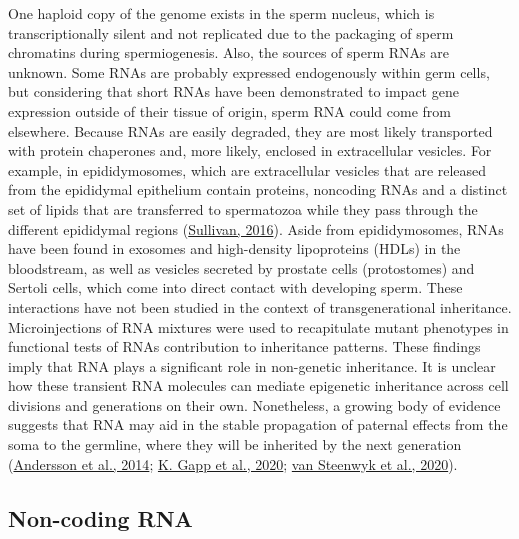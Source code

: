 \documentclass[12pt,twoside]{reedthesis}
\begin{document}
One haploid copy of the genome exists in the sperm nucleus, which is
transcriptionally silent and not replicated due to the packaging of
sperm chromatins during spermiogenesis. Also, the sources of sperm RNAs
are unknown. Some RNAs are probably expressed endogenously within germ
cells, but considering that short RNAs have been demonstrated to impact
gene expression outside of their tissue of origin, sperm RNA could come
from elsewhere. Because RNAs are easily degraded, they are most likely
transported with protein chaperones and, more likely, enclosed in
extracellular vesicles. For example, in epididymosomes, which are
extracellular vesicles that are released from the epididymal epithelium
contain proteins, noncoding RNAs and a distinct set of lipids that are
transferred to spermatozoa while they pass through the different
epididymal regions (\protect\hyperlink{ref-sullivan2016}{Sullivan, 2016}). Aside from epididymosomes, RNAs have
been found in exosomes and high-density lipoproteins (HDLs) in the
bloodstream, as well as vesicles secreted by prostate cells
(protostomes) and Sertoli cells, which come into direct contact with
developing sperm. These interactions have not been studied in the
context of transgenerational inheritance. Microinjections of RNA
mixtures were used to recapitulate mutant phenotypes in functional tests
of RNAs contribution to inheritance patterns. These findings imply that
RNA plays a significant role in non-genetic inheritance. It is unclear
how these transient RNA molecules can mediate epigenetic inheritance
across cell divisions and generations on their own. Nonetheless, a
growing body of evidence suggests that RNA may aid in the stable
propagation of paternal effects from the soma to the germline, where
they will be inherited by the next generation (\protect\hyperlink{ref-andersson2014}{Andersson et al., 2014}; \protect\hyperlink{ref-gapp2020}{K. Gapp et al., 2020}; \protect\hyperlink{ref-vansteenwyk2020}{van Steenwyk et al., 2020}).

\hypertarget{non-coding-rna}{%
\subsection*{Non-coding RNA}\label{non-coding-rna}}
\end{document}
